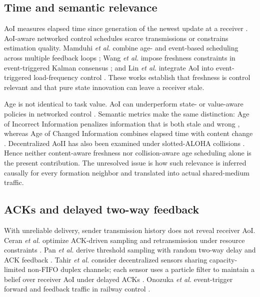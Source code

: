 \subsection{Time and semantic relevance}

AoI measures elapsed time since generation of the newest update at a receiver
\cite{kaul2012realtime,sun2017update,yates2021aoisurvey}. AoI-aware networked
control schedules scarce transmissions or constrains estimation quality.
Mamduhi \emph{et al.} combine age- and event-based scheduling across multiple
feedback loops \cite{mamduhi2020freshness}; Wang \emph{et al.} impose
freshness constraints in event-triggered Kalman consensus
\cite{wang2021freshness}; and Lin \emph{et al.} integrate AoI into
event-triggered load-frequency control \cite{lin2023eventtriggered}. These
works establish that freshness is control relevant and that pure state
innovation can leave a receiver stale.

Age is not identical to task value. AoI can underperform state- or
value-aware policies in networked control \cite{ayan2019aoivoi,mamduhi2020freshness}.
Semantic metrics make the same distinction: Age of Incorrect Information
penalizes information that is both stale and wrong \cite{maatouk2020aoii},
whereas Age of Changed Information combines elapsed time with content change
\cite{wang2022aoci}. Decentralized AoII has also been examined under
slotted-ALOHA collisions \cite{nayak2023decentralizedaoii}. Hence neither
content-aware freshness nor collision-aware age scheduling alone is the
present contribution. The unresolved issue is how such relevance is inferred
causally for every formation neighbor and translated into actual shared-medium
traffic.

\subsection{ACKs and delayed two-way feedback}

With unreliable delivery, sender transmission history does not reveal
receiver AoI. Ceran \emph{et al.} optimize ACK-driven sampling and
retransmission under resource constraints \cite{ceran2019average}. Pan
\emph{et al.} derive threshold sampling with random two-way delay and ACK
feedback \cite{pan2023twoway}. Tahir \emph{et al.} consider decentralized
sensors sharing capacity-limited non-FIFO duplex channels; each sensor uses a
particle filter to maintain a belief over receiver AoI under delayed ACKs
\cite{tahir2024collaborative}. Onozuka \emph{et al.} event-trigger forward and
feedback traffic in railway control \cite{onozuka2024aoi}.


